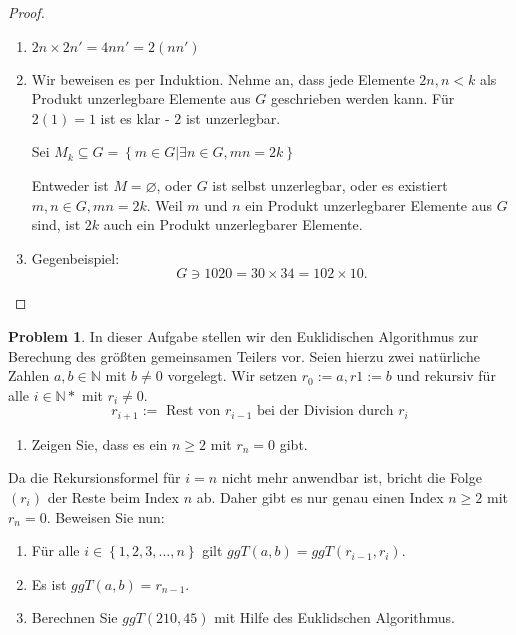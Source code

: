 \documentclass[prb,12pt]{revtex4-2}
\theoremstyle{definition}
\newtheorem{Problem}{Problem}
\theoremstyle{definition}
\newenvironment{parts}{\begin{enumerate}[label=(\alph*)]}{\end{enumerate}}
\newcommand{\N}{\mathbb{N}}
\begin{document}
\begin{proof}
	\begin{parts}
	\item $2n\times 2n'=4nn'=2(nn')$
	\item Wir beweisen es per Induktion. Nehme an, dass jede Elemente  $2n, n < k$ als Produkt unzerlegbare Elemente aus $G$ geschrieben werden kann. F\"{u}r $2(1)=1$ ist es klar - $2$ ist unzerlegbar.
		
		Sei $M_k\subseteq G =\left\{ m\in G| \exists n\in G, mn=2k\right\} $
		
		Entweder ist $M=\varnothing$, oder $G$ ist selbst unzerlegbar, oder es existiert $m,n\in G, mn=2k$. Weil $m$ und $n$ ein Produkt unzerlegbarer Elemente aus $G$ sind, ist $2k$ auch ein Produkt unzerlegbarer Elemente.
	\item Gegenbeispiel:
		\[
		G\ni 1020=30\times 34=102\times 10
		.\] 
	\end{parts}
\end{proof}
\begin{Problem}
	In dieser Aufgabe stellen wir den Euklidischen Algorithmus zur Berechung des größten gemeinsamen Teilers vor. Seien hierzu zwei natürliche Zahlen $a, b \in \N$ mit $b \neq 0$ vorgelegt. Wir setzen $r_0 := a, r1 := b$ und rekursiv für alle $i \in \N*$ mit $r_i \neq 0$.
		\[r_{i+1}:=\text{ Rest von }r_{i-1}\text{ bei der Division durch }r_i\]
	\begin{enumerate}[label=(\alph*)]
	\item	Zeigen Sie, dass es ein $n\ge 2$ mit  $r_n=0$ gibt.
	\end{enumerate}	
Da die Rekursionsformel für $i = n$ nicht mehr anwendbar ist, bricht die Folge $(r_i)$ der Reste beim Index $n$ ab. Daher gibt es nur genau einen Index $n \ge 2$ mit $r_n = 0$. Beweisen Sie nun:
\begin{enumerate}[resume*]
\item F\"{u}r alle $i\in \left\{ 1,2,3,\dots,n \right\} $ gilt $ggT(a,b)=ggT(r_{i-1},r_i)$.
\item Es ist $ggT(a,b)=r_{n-1}$.
\item Berechnen Sie $ggT(210,45)$ mit Hilfe des Euklidschen Algorithmus.
\end{enumerate}
\end{Problem}
\end{document}
